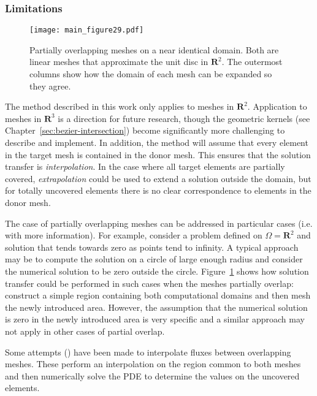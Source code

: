 \documentclass[letterpaper,10pt]{article}
\theoremstyle{definition}
\newcommand{\reals}{\mathbf{R}}
\begin{document}
\subsubsection{Limitations}

\begin{figure}
  \texttt{[image: main\_figure29.pdf]}
  \centering
  \captionsetup{width=.75\linewidth}
  \caption{Partially overlapping meshes on a near identical domain. Both are
    linear meshes that approximate the unit disc in \(\reals^2\). The outermost
    columns show how the domain of each mesh can be expanded so they agree.}
  \label{fig:partially-overlapping}
\end{figure}

The method described in this work only applies to meshes in \(\reals^2\).
Application to meshes in \(\reals^3\) is a direction for future research,
though the geometric kernels (see Chapter~\ref{sec:bezier-intersection})
become significantly more challenging to describe and implement. In
addition, the method will assume that every element in the
target mesh is contained in the donor mesh. This ensures that the solution
transfer is \emph{interpolation}. In the case where all target elements are
partially covered, \emph{extrapolation} could be used to extend a solution
outside the domain, but for totally uncovered elements there is no clear
correspondence to elements in the donor mesh.

The case of partially overlapping meshes can be addressed in particular
cases (i.e. with more information). For example, consider a problem
defined on \(\Omega = \reals^2\) and solution
that tends towards zero as points tend to infinity. A typical approach
may be to compute the solution on a circle of large enough radius and
consider the numerical solution to be zero outside the circle.
Figure~\ref{fig:partially-overlapping} shows how solution transfer could be
performed in such cases when the meshes partially overlap: construct a
simple region containing both computational domains and then mesh the
newly introduced area. However, the assumption that the numerical solution
is zero in the newly introduced area is very specific and
a similar approach may not apply in other cases of partial overlap.

Some attempts (\cite{Berger1987, Chesshire1994, Cai1999}) have been
made to interpolate fluxes between overlapping meshes. These perform
an interpolation on the region common to both meshes and then numerically
solve the PDE to determine the values on the uncovered elements.
\end{document}
